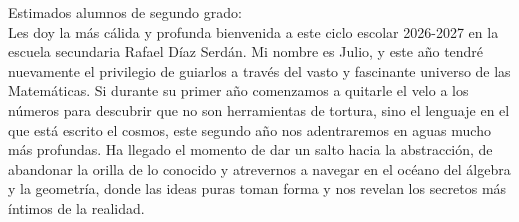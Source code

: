 \documentclass[11pt]{report}
\begin{document}
\begin{titlepage}




\vspace{0.7em}

\raggedright Estimados alumnos de segundo grado:\\

Les doy la más cálida y profunda bienvenida a este ciclo escolar 2026-2027 en la escuela secundaria Rafael Díaz Serdán. Mi nombre es Julio, y este año tendré nuevamente el privilegio de guiarlos a través del vasto y fascinante universo de las Matemáticas. Si durante su primer año comenzamos a quitarle el velo a los números para descubrir que no son herramientas de tortura, sino el lenguaje en el que está escrito el cosmos, este segundo año nos adentraremos en aguas mucho más profundas. Ha llegado el momento de dar un salto hacia la abstracción, de abandonar la orilla de lo conocido y atrevernos a navegar en el océano del álgebra y la geometría, donde las ideas puras toman forma y nos revelan los secretos más íntimos de la realidad.


\end{titlepage}
\end{document}
